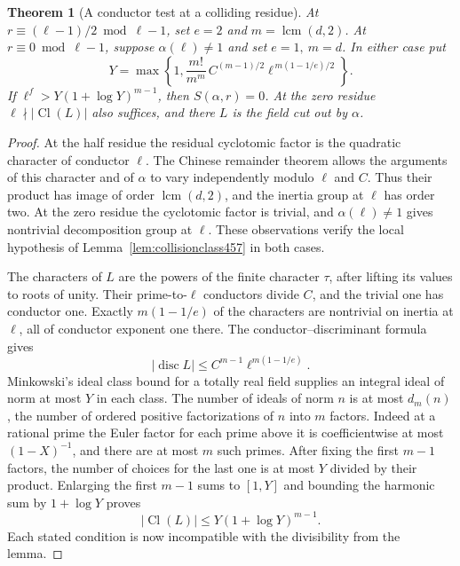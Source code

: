 \documentclass[a4paper,11pt]{article}
\newtheorem{theorem}[proposition]{Theorem}
\theoremstyle{definition}
\theoremstyle{remark}
\numberwithin{equation}{section}
\newcommand{\Cl}{\operatorname{Cl}}
\begin{document}
\begin{theorem}[A conductor test at a colliding residue]\leavevmode
\label{thm:smallcollision457}
At \(r\equiv(\ell-1)/2\bmod{\ell-1}\), set \(e=2\) and
\(m=\operatorname{lcm}(d,2)\). At \(r\equiv0\bmod{\ell-1}\),
suppose \(\alpha(\ell)\ne1\) and set \(e=1,\ m=d\).
In either case put
\[
 Y=\max\!\left\{1,\frac{m!}{m^m}\,
         C^{(m-1)/2}\ell^{\,m(1-1/e)/2}\right\}.
\]
If \(\ell^f>Y(1+\log Y)^{m-1}\), then \(S(\alpha,r)=0\).
At the zero residue \(\ell\nmid |\Cl(L)|\) also suffices, and
there \(L\) is the field cut out by \(\alpha\).
\end{theorem}
\begin{proof}
At the half residue the residual cyclotomic factor is the quadratic
character of conductor \(\ell\). The Chinese remainder theorem
allows the arguments of this character and of \(\alpha\) to vary
independently modulo \(\ell\) and \(C\). Thus their product has
image of order \(\operatorname{lcm}(d,2)\), and the inertia group
at \(\ell\) has order two. At the zero residue the cyclotomic
factor is trivial, and \(\alpha(\ell)\ne1\) gives nontrivial
decomposition group at \(\ell\). These observations verify the
local hypothesis of Lemma~\ref{lem:collisionclass457} in both cases.

The characters of \(L\) are the powers of the finite character
\(\tau\), after lifting its values to roots of unity. Their
prime-to-\(\ell\) conductors divide \(C\), and the trivial one
has conductor one. Exactly \(m(1-1/e)\) of the characters are
nontrivial on inertia at \(\ell\), all of conductor exponent one
there. The conductor--discriminant formula gives
\[
                  |\operatorname{disc} L|
                       \le C^{m-1}\ell^{m(1-1/e)}.
\]
Minkowski's ideal class bound for a totally real field supplies
an integral ideal of norm at most \(Y\) in each class. The number
of ideals of norm \(n\) is at most \(d_m(n)\), the number of
ordered positive factorizations of \(n\) into \(m\) factors.
Indeed at a rational prime the Euler factor for each prime above
it is coefficientwise at most \((1-X)^{-1}\), and there are at
most \(m\) such primes. After fixing the first \(m-1\) factors,
the number of choices for the last one is at most \(Y\) divided
by their product. Enlarging the first \(m-1\) sums to \([1,Y]\)
and bounding the harmonic sum by \(1+\log Y\) proves
\[
                     |\Cl(L)|\le Y(1+\log Y)^{m-1}.
\]
Each stated condition is now incompatible with the divisibility
from the lemma.
\end{proof}
\end{document}
